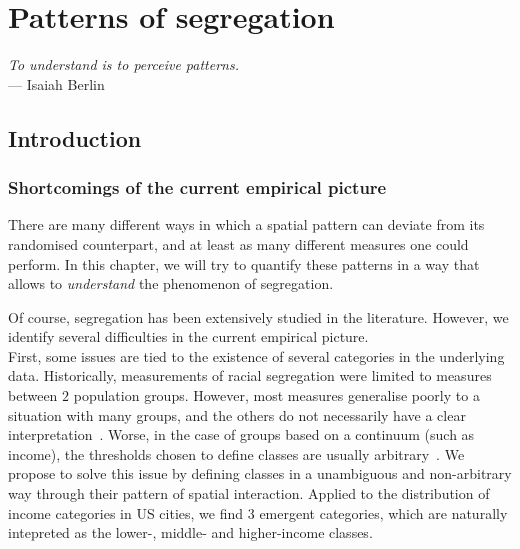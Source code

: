 %
\chapter{Patterns of segregation}
\label{chap:patterns_segregation}

\begin{flushright}{\slshape    
To understand is to perceive patterns.} \\ \medskip
--- Isaiah Berlin~\cite{Berlin:2013}
\end{flushright}


\bigskip


\section{Introduction}
\label{sec:introduction}

\subsection{Shortcomings of the current empirical picture}
\label{sub:shortcomings_of_the_current_empirical_picture}

There are many different ways in which a spatial pattern can deviate from its
randomised counterpart, and at least as many different measures one could
perform. In this chapter, we will try to quantify these patterns in a way that
allows to \emph{understand} the phenomenon of segregation. 

Of course, segregation has been extensively studied in the literature. However,
we identify several difficulties in the current empirical picture.\\


First, some issues are tied to the existence of several categories in the
underlying data. Historically, measurements of racial segregation were limited
to measures between $2$ population groups. However, most measures generalise
poorly to a situation with many groups, and the others do not necessarily have a
clear interpretation~\cite{Reardon:2002}. Worse, in the case of groups based on
a continuum (such as income), the thresholds chosen to define classes are
usually arbitrary~\cite{Jargowsky:1996}. We propose to solve this issue by
defining classes in a unambiguous and non-arbitrary way through their pattern of
spatial interaction. Applied to the distribution of income categories in US
cities, we find $3$ emergent categories, which are naturally intepreted as the
lower-, middle- and higher-income classes.\\

